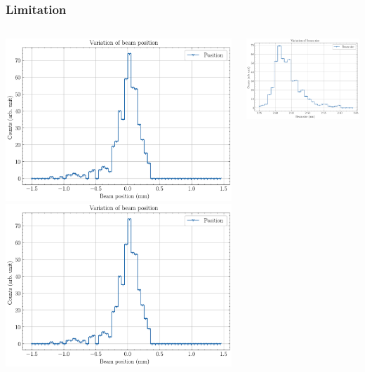 \begin{frame}
  \frametitle{Limitation}
  \begin{columns}[T]
    \begin{column}{0.45\textwidth}
      \includegraphics[width=1\textwidth]{04_Test/fig/fig000_hist_variation_a}
      \includegraphics[width=1\textwidth]{04_Test/fig/fig000_hist_variation_a}
    \end{column}
    \begin{column}{0.45\textwidth}
      \includegraphics[width=1\textwidth]{04_Test/fig/fig000_hist_variation_b}

\end{column}
\end{columns}
\end{frame}

